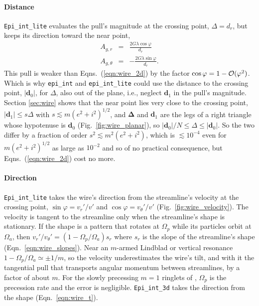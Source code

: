 \documentclass[twocolumn]{aastex702}
\newcommand{\code}[1]{\texttt{#1}}   %
\begin{document}
\paragraph{Distance} \code{Epi\_int\_lite} evaluates the pull's magnitude at the crossing point,
$\Delta = d_r$, but keeps its direction toward the near point,
\begin{subequations}
\label{eqn:wire_lite}
\begin{eqnarray}
    A_{g,r} &=& \frac{2G\lambda\cos\varphi}{d_r} \label{eqn:wire_lite_a}\\
    A_{g,\theta} &=& -\frac{2G\lambda\sin\varphi}{d_r}. \label{eqn:wire_lite_b}
\end{eqnarray}
\end{subequations}
This pull is weaker than Eqns.\ (\ref{eqn:wire_2d}) by the factor $\cos\varphi = 1 -
{\cal O}(\varphi^2)$. Which is why \code{epi\_int} and \code{epi\_int\_lite} could use the distance
to the crossing point, $|\mathbf{d}_0|$, for $\Delta$, also out of the plane, i.e., neglect
$\mathbf{d}_1$ in the pull's magnitude. Section \ref{sec:wire} shows that the near point lies very
close to the crossing point, $|\mathbf{d}_1| \le s\Delta$ with $s \lesssim m(e^2 + i^2)^{1/2}$, and
$\boldsymbol{\Delta}$ and $\mathbf{d}_1$ are the legs of a right triangle whose hypotenuse is $\mathbf{d}_0$
(Fig.~\ref{fig:wire_planar}), so $|\mathbf{d}_0|/N \le \Delta \le |\mathbf{d}_0|$. So the two differ by a fraction of order
$s^2 \lesssim m^2(e^2 + i^2)$, which is $\lesssim\!10^{-4}$ even for $m(e^2 + i^2)^{1/2}$ as large as
$10^{-2}$ and so of no practical consequence, but Eqns.\ (\ref{eqn:wire_2d}) cost no more.

\paragraph{Direction} \code{Epi\_int\_lite} takes the wire's direction from the streamline's velocity at
the crossing point, $\sin\varphi = v_r'/v'$ and $\cos\varphi = v_\theta'/v'$
(Fig.~\ref{fig:wire_velocity}). The velocity is tangent to the streamline only when the
streamline's shape is stationary. If the shape is a pattern that rotates at $\Omega_p$ while its
particles orbit at $\Omega_a$, then $v_r'/v_\theta' = (1 - \Omega_p/\Omega_a)s_r$ where $s_r$ is the
slope of the streamline's shape (Eqn.\ \ref{eqn:wire_slopes}). Near an $m$-armed Lindblad or vertical resonance
$1 - \Omega_p/\Omega_a \simeq \pm1/m$, so the velocity underestimates the wire's tilt, and with it the
tangential pull that transports angular momentum between streamlines, by a factor of about $m$. For
the slowly precessing $m = 1$ ringlets of \cite{H25}, $\Omega_p$ is the precession rate and the error
is negligible. \code{Epi\_int\_3d} takes the direction from the shape (Eqn.\ \ref{eqn:wire_t}).
\end{document}
